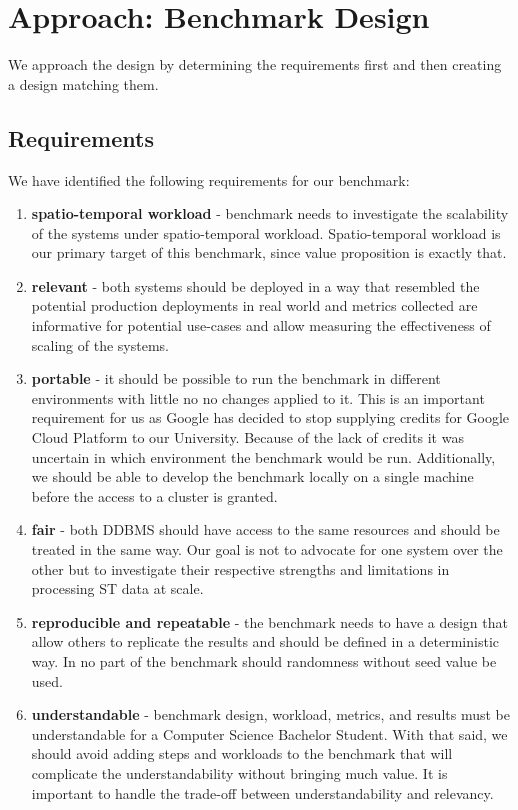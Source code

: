 \section{Approach: Benchmark Design}
\label{cha:benchmarkdesign}

We approach the design by determining the requirements first and then creating a design matching them.

\subsection{Requirements}

We have identified the following requirements for our benchmark:
\begin{enumerate}
  \item \textbf{spatio-temporal workload} \label{req:spatiotemporal-workload}
    - benchmark needs to investigate the scalability of the systems under spatio-temporal workload.
    Spatio-temporal workload is our primary target of this benchmark, since \mobilitydbc value proposition is exactly that.
  \item \textbf{relevant} \label{req:relevant}
    - both systems should be deployed in a way that resembled the potential production deployments in real world and metrics collected are informative for potential use-cases and allow measuring the effectiveness of scaling of the systems.
  \item \textbf{portable} \label{req:portable}
    - it should be possible to run the benchmark in different environments with little no no changes applied to it.
    This is an important requirement for us as Google has decided to stop supplying credits for Google Cloud Platform to our University.
    Because of the lack of credits it was uncertain in which environment the benchmark would be run.
    Additionally, we should be able to develop the benchmark locally on a single machine before the access to a cluster is granted.
  \item \textbf{fair} \label{req:fair}
    - both DDBMS should have access to the same resources and should be treated in the same way.
    Our goal is not to advocate for one system over the other but to investigate their respective strengths and limitations in processing ST data at scale.
  \item \textbf{reproducible and repeatable} \label{req:reproducible-repeatable}
    - the benchmark needs to have a design that allow others to replicate the results and should be defined in a deterministic way.
    In no part of the benchmark should randomness without seed value be used.
  \item \textbf{understandable} \label{req:understandable}
    - benchmark design, workload, metrics, and results must be understandable for a Computer Science Bachelor Student.
    With that said, we should avoid adding steps and workloads to the benchmark that will complicate the understandability without bringing much value.
    It is important to handle the trade-off between understandability and relevancy.
\end{enumerate}

